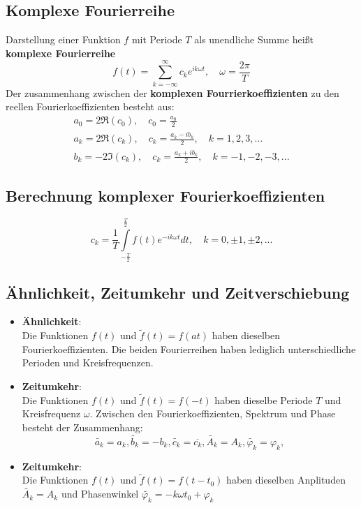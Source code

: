 \documentclass[12pt]{article}
\begin{document}
\subsection{Komplexe Fourierreihe}
Darstellung einer Funktion $f$ mit Periode $T$ als unendliche Summe heißt \textbf{komplexe Fourierreihe}
\begin{equation*}
	f(t) = \sum\limits_{k=-\infty}^{\infty}c_ke^{ik\omega t}, \quad \omega=\frac{2\pi}{T}
\end{equation*}
Der zusammenhang zwischen der \textbf{komplexen Fourrierkoeffizienten} zu den reellen Fourierkoeffizienten besteht aus:
\begin{gather*}
	a_0=2\Re(c_0), \quad c_0=\frac{a_0}{2}\\
	a_k=2\Re(c_k), \quad c_k=\frac{a_k-ib_k}{2}, \quad k=1,2,3,...\\
	b_k=-2\Im(c_k), \quad c_k=\frac{a_k+ib_k}{2}, \quad k=-1,-2,-3,...
\end{gather*}
\subsection{Berechnung komplexer Fourierkoeffizienten}
\begin{equation*}
	c_k=\frac{1}{T}\int\limits_{-\frac{T}{2}}^{\frac{T}{2}}f(t)e^{-ik\omega t}dt, \quad k=0,\pm1,\pm2,...
\end{equation*}
\subsection{Ähnlichkeit, Zeitumkehr und Zeitverschiebung}
\begin{itemize}
	\item \textbf{Ähnlichkeit}:\\
			Die Funktionen $f(t)$ und $\tilde{f}(t)=f(at)$ haben dieselben Fourierkoeffizienten. Die beiden Fourierreihen haben lediglich unterschiedliche Perioden und Kreisfrequenzen.
	\item \textbf{Zeitumkehr}:\\
			Die Funktionen $f(t)$ und $\tilde{f}(t)=f(-t)$ haben dieselbe Periode $T$ und Kreisfrequenz $\omega$. Zwischen den Fourierkoeffizienten, Spektrum und Phase besteht der Zusammenhang:
			\begin{equation*}
				\tilde{a_k}=a_k,\tilde{b_k}=-b_k,\tilde{c_k}=\overline{c_k},\tilde{A_k}=A_k,\tilde{\varphi_k}=\varphi_k, 
			\end{equation*}
	\item\textbf{Zeitumkehr}:\\
			Die Funktionen $f(t)$ und $\tilde{f}(t)=f(t-t_0)$ haben dieselben Anplituden $\tilde{A_k}=A_k$ und Phasenwinkel $\tilde{\varphi_k}=-k\omega t_0 + \varphi_k$
\end{itemize}
\end{document}
